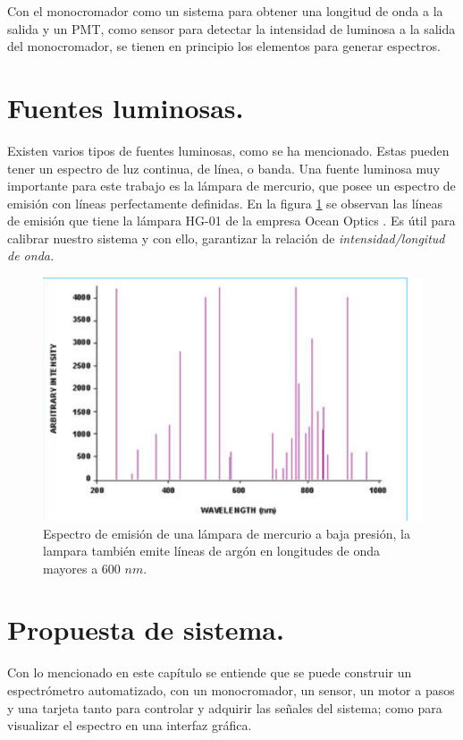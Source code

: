 Con el monocromador como un sistema para obtener una longitud de onda a la salida y un PMT, como sensor para detectar la intensidad de luminosa a la salida del monocromador, se tienen en principio los elementos para generar espectros.

\section{Fuentes luminosas.}
Existen varios tipos de fuentes luminosas, como se ha mencionado. Estas pueden tener un espectro de luz continua, de línea, o banda. Una fuente luminosa muy importante para este trabajo es la lámpara de mercurio, que posee un espectro de emisión con líneas perfectamente definidas. En la figura \ref{fig:lamparamercurio} se observan las líneas de emisión que tiene la lámpara HG-01 de la empresa Ocean Optics \cite{Excel2000}. Es útil para calibrar nuestro sistema y con ello, garantizar la relación de \textit{intensidad/longitud de onda.}
\begin{figure}[h]
	\centering
	\includegraphics[width=0.7\linewidth]{Imagenes/lamparaMercurio}
	\caption[Espectro de emisión de una lámpara de mercurio a baja presión.]{Espectro de emisión de una lámpara de mercurio a baja presión, la lampara también emite líneas de argón en longitudes de onda mayores a 600 $nm$. \cite{Excel2000}}
	\label{fig:lamparamercurio}
\end{figure}
\section{Propuesta de sistema.}
Con lo mencionado en este capítulo se entiende que se puede construir un espectrómetro automatizado, con un monocromador, un sensor, un motor a pasos y una tarjeta tanto para controlar y adquirir las señales del sistema; como para visualizar el espectro en una interfaz gráfica. 
